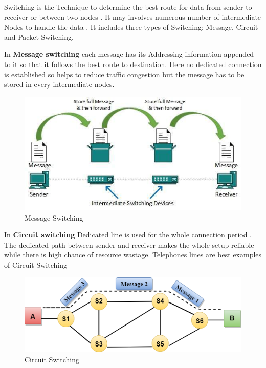 \documentclass[a4paper,12pt]{article}
\begin{document}
\begin{A}{  Switching is the Technique to determine the best route for data from sender to receiver  or between two nodes . It may involves numerous number of intermediate Nodes to handle the data . It includes three types of Switching: Message, Circuit and Packet Switching.
\begin{multicols}{2}
In \textbf{Message switching} each message has its Addressing information appended to it so that it follows the best route to destination. Here no dedicated connection is established so helps to reduce traffic congestion but the message has to be stored in every intermediate nodes.
\columnbreak
\begin{figure}[H]
\centering
\includegraphics[scale=0.45,cframe=blue 0.5pt 3pt]{message_switching.jpg} 
\caption{Message Switching }
\end{figure}
\end{multicols}
\begin{multicols}{2}
In \textbf{Circuit switching} Dedicated line is used for the whole connection period . The dedicated path between sender and receiver  makes the whole setup reliable while there is high chance of resource wastage. Telephones lines are best examples of Circuit Switching
\columnbreak
\begin{figure}[H]
\centering
\includegraphics[scale=0.6,cframe=blue 0.5pt 3pt]{circuit-switching.png} 
\caption{Circuit Switching }

\end{figure}
\end{multicols}}
\end{A}
\end{document}
